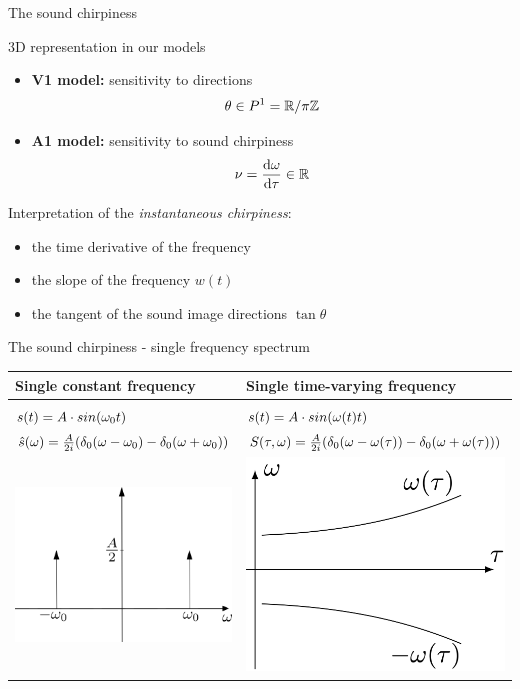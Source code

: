 \documentclass[10pt,american,ignorenonframetext,aspectratio=1610]{beamer}
\providecommand{\tightlist}{%
  \setlength{\itemsep}{0pt}\setlength{\parskip}{0pt}}
\theoremstyle{remark}
\begin{document}
\begin{frame}{The sound chirpiness}
\protect\hypertarget{the-sound-chirpiness}{}

3D representation in our models

\begin{itemize}
\tightlist
\item
  \textbf{V1 model:} sensitivity to directions
  \[\theta\in P^1=\mathbb{R}/\pi\mathbb{Z}\]
\item
  \textbf{A1 model:} sensitivity to sound chirpiness
  \[\nu=\frac{\mathrm{d}\omega}{\mathrm{d}\tau}\in\mathbb{R}\]
\end{itemize}

Interpretation of the \emph{instantaneous chirpiness}:

\begin{itemize}
\tightlist
\item
  the time derivative of the frequency
\item
  the slope of the frequency \(w(t)\)
\item
  the tangent of the sound image directions \(\tan\theta\)
\end{itemize}

\end{frame}

\begin{frame}{The sound chirpiness - single frequency spectrum}
\protect\hypertarget{the-sound-chirpiness---single-frequency-spectrum}{}

\centering
\begin{tabular}{ >{\centering\arraybackslash} m{6cm}|>{\centering\arraybackslash} m{6cm} }
\textbf{Single constant frequency} & \textbf{Single time-varying frequency}\\\hline &\\
$s(t)=A\cdot sin(\omega_0 t)$          & $s(t)=A\cdot sin(\omega(t) t)$ \\[0.6em]
$\hat s(\omega) = \frac{A}{2i} (\delta_0(\omega-\omega_0) - \delta_0(\omega+\omega_0))$ &
$S(\tau,\omega) = \frac{A}{2i} (\delta_0(\omega-\omega(\tau)) - \delta_0(\omega+\omega(\tau)))$\\[0.6em]
\includegraphics[width=.30\textwidth]{img/sine_spectrum.png} &
\includegraphics[width=.25\textwidth]{img/single_freq.png}\\[0.4em]
\end{tabular}

\end{frame}
\end{document}
